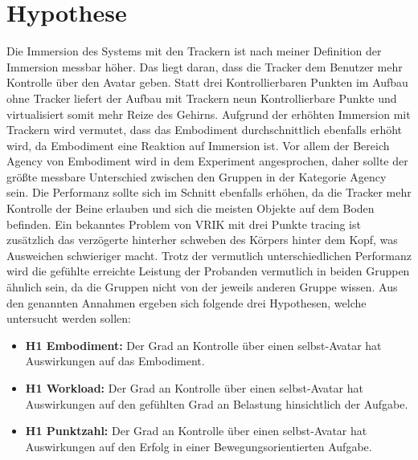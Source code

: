 \section{Hypothese}
Die Immersion des Systems mit den Trackern ist nach meiner Definition der Immersion messbar höher. Das liegt daran, dass die Tracker dem Benutzer mehr Kontrolle über den Avatar geben. Statt drei Kontrollierbaren Punkten im Aufbau ohne Tracker liefert der Aufbau mit Trackern neun Kontrollierbare Punkte und virtualisiert somit mehr Reize des Gehirns.
Aufgrund der erhöhten Immersion mit Trackern wird vermutet, dass das Embodiment durchschnittlich ebenfalls erhöht wird, da Embodiment eine Reaktion auf Immersion ist. Vor allem der Bereich Agency von Embodiment wird in dem Experiment angesprochen, daher sollte der größte messbare Unterschied zwischen den Gruppen in der Kategorie Agency sein.
Die Performanz sollte sich im Schnitt ebenfalls erhöhen, da die Tracker mehr Kontrolle der Beine erlauben und sich die meisten Objekte auf dem Boden befinden. Ein bekanntes Problem von VRIK mit drei Punkte tracing ist zusätzlich das verzögerte hinterher schweben des Körpers hinter dem Kopf, was Ausweichen schwieriger macht. Trotz der vermutlich unterschiedlichen Performanz wird die gefühlte erreichte Leistung der Probanden vermutlich in beiden Gruppen ähnlich sein, da die Gruppen nicht von der jeweils anderen Gruppe wissen.
Aus den genannten Annahmen ergeben sich folgende drei Hypothesen, welche untersucht werden sollen:
\begin{itemize} 
\item \textbf{H1 Embodiment:} Der Grad an Kontrolle über einen selbst-Avatar hat Auswirkungen auf das Embodiment.
\item \textbf{H1 Workload:} Der Grad an Kontrolle über einen selbst-Avatar hat Auswirkungen auf den gefühlten Grad an Belastung hinsichtlich der Aufgabe.
\item \textbf{H1 Punktzahl:} Der Grad an Kontrolle über einen selbst-Avatar hat Auswirkungen auf den Erfolg in einer Bewegungsorientierten Aufgabe.
\end{itemize}


